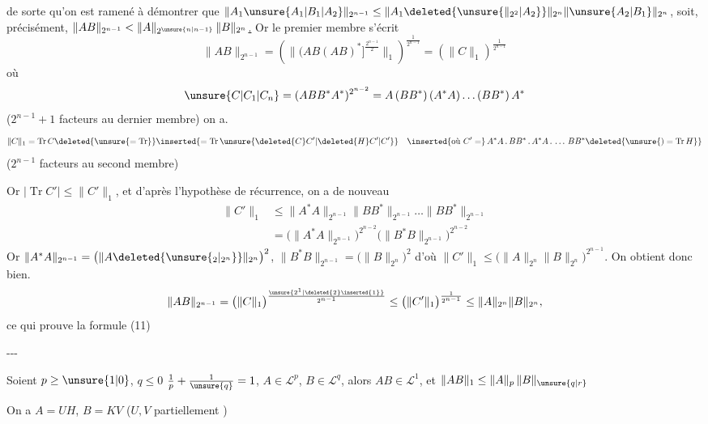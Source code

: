 de sorte qu'on est ramené à démontrer 
  que
$\|A_1\unsure{A_1|B_1|A_2}\|_{2^{n-1}}\leq\|A_1\deleted{\unsure{\|_{2^2}|A_2}}\|_{2^n}\|\unsure{A_2|B_1}\|_{2^n}$, soit, précisément,
\uline{$\|AB\|_{2^{n-1}}<\|A\|_{2^{\unsure{n|n-1}}}\,\|B\|_{2^n}$.}
Or le premier membre s'écrit
\[
\|AB\|_{2^{n-1}}=\left(\bigl\|\bigl(AB(AB)^*\bigr]^{\frac{2^{n-1}}{2}}\bigr\|_1\right)^{\frac1{2^{n-1}}}
=\left(\|C\|_1\right)^{\frac1{2^{n-1}}}
\]
où
\[
\unsure{C|C_1|C_n}=(ABB^*A^*)^{2^{n-2}}=A\,(BB^*)\,(A^*A)\ldots(BB^*)\,A^*
\]
($2^{n-1}+1$ facteurs au dernier membre) on a.
\[
\|C\|_1=\operatorname{Tr} C\deleted{\unsure{=\operatorname{Tr}}}
\inserted{=\operatorname{Tr}\unsure{\deleted{C}C'|\deleted{H}C'|C'}}\quad
\inserted{\text{où }C'=}\,A^*A\,.\,BB^*\,.\,A^*A\,.\,\ldots\,BB^*
\deleted{\unsure{)=\operatorname{Tr}H}}
\]
($2^{n-1}$ facteurs au second membre)

Or $|\operatorname{Tr} C'|\leq\|C'\|_1$, et d'après l'hypothèse de récurrence, on a de nouveau
\[
\begin{aligned}
\|C'\|_1&\leq\|A^*A\|_{2^{n-1}}\|BB^*\|_{2^{n-1}}\ldots\|BB^*\|_{2^{n-1}}\\
&=\bigl(\|A^*A\|_{2^{n-1}}\bigr)^{2^{n-2}}\bigl(\|B^*B\|_{2^{n-1}}\bigr)^{2^{n-2}}
\end{aligned}
\]
Or $\|A^*A\|_{2^{n-1}}=\bigl(\|A\deleted{\unsure{_2|_{2^n}}}\|_{2^n}\bigr)^2$,
$\|B^*B\|_{2^{n-1}}=\bigl(\|B\|_{2^n}\bigr)^2$
d'où $\|C'\|_1\leq\bigl(\|A\|_{2^n}\|B\|_{2^n}\bigr)^{2^{n-1}}$. On obtient donc bien.
\[
\|AB\|_{2^{n-1}}=\bigl(\|C\|_1\bigr)^{\frac{\unsure{2^1|\deleted{2}\inserted{1}}}{2^{n-1}}}
\leq\bigl(\|C'\|_1\bigr)^{\frac1{2^{n-1}}}\leq\|A\|_{2^n}\|B\|_{2^n},
\]
ce qui prouve la formule (11)

\medskip\noindent\hspace*{2em}-\enspace-\enspace-

 Soient $p\geq\unsure{1|0}$,
$q\leq0$ \quad $\frac1p+\frac1{\unsure{q}}=1$,
$A\in\mathcal L^p$, $B\in\mathcal L^q$, alors $AB\in\mathcal L^1$, et
$\|AB\|_1\leq\|A\|_p\,\|B\|_{\unsure{q|r}}$

On a $A=UH$, $B=KV$ ($U,V$ partiellement )

